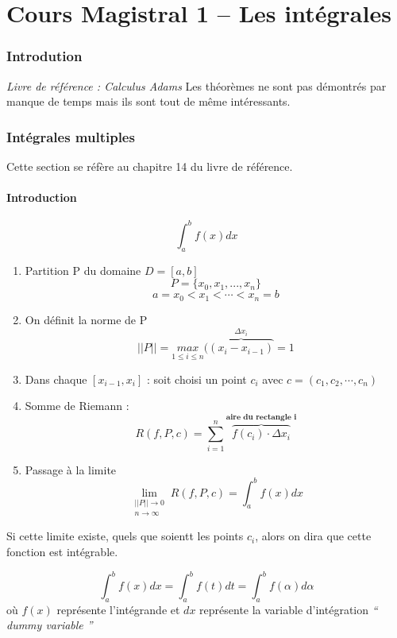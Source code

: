 \part{Cours Magistral 1 -- Les intégrales}
\section{Introdution}
\emph{Livre de référence : Calculus Adams}
Les théorèmes ne sont pas démontrés par manque de temps mais ils sont tout de même intéressants.
\section{Intégrales multiples}

Cette section se réfère au chapitre 14 du livre de référence.
\subsection{Introduction}
\[\int_{a}^{b} {f(x) dx}\]


\begin{enumerate}

\item Partition P du domaine $D=[a,b]$
$$ P = \{x_0,x_1,...,x_n\}$$
$$a=x_0<x_1<\cdots<x_n=b$$
\item On définit la norme de P
$$||P|| = \underset{1\le i \le n}{max}(\overbrace{(x_i-x_{i-1})}^{\Delta x_i}=1$$

\item Dans chaque $[{x_{i-1},x_i}]$ : soit choisi un point $c_i$ avec $c=(c_1,c_2,\cdots,c_n)$

\item  Somme de Riemann : $$R(f,P,c)=\sum_{i=1}^{n} \overbrace{f(c_i)\cdot \Delta  x_i}^{\textbf{aire du rectangle i}} $$

\item Passage à la limite $$\lim\limits_{\substack{||P|| \to 0 \\ n \to \infty}} R(f,P,c) =\int_{a}^{b} {f(x) dx}$$

\end{enumerate}
Si cette limite existe, quels que soientt les points $c_i$, alors on dira que cette fonction est intégrable.
\begin{myrem}
$$\int_{a}^{b} {f(x) dx} = \int_{a}^{b} {f(t) dt} = \int_{a}^{b} {f(\alpha) d\alpha}$$ où $f(x)$ représente l'intégrande et $dx$ représente la variable d'intégration \textit{`` dummy variable ''}
\end{myrem}

